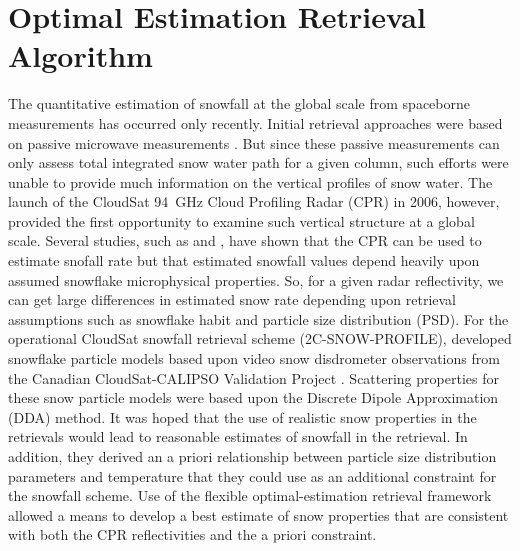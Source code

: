 \section{Optimal Estimation Retrieval Algorithm} %
\label{sec:retrieval}
The quantitative estimation of snowfall at the global scale from spaceborne measurements has occurred only recently. Initial retrieval approaches were based on passive microwave measurements \citep{skofronick-jackson_physical_2004,noh_development_2006}. But since these passive measurements can only assess total integrated snow water path for a given column, such efforts were unable to provide much information on the vertical profiles of snow water. 
The launch of the CloudSat \SI{94}{\giga\hertz} Cloud Profiling Radar (CPR) in 2006, however, provided the first opportunity to examine such vertical structure at a global scale. Several studies, such as \citet{matrosov_modeling_2007} and \citet{kulie_utilizing_2009}, have shown that the CPR can be used to estimate snofall rate but that estimated snowfall values depend heavily upon assumed snowflake microphysical properties. So, for a given radar reflectivity, we can get large differences in estimated snow rate depending upon retrieval assumptions such as snowflake habit and particle size distribution (PSD).
%
For the operational CloudSat snowfall retrieval scheme (2C-SNOW-PROFILE), \citet{wood_microphysical_2015} developed snowflake particle models based upon video snow disdrometer observations from the Canadian CloudSat-CALIPSO Validation Project \citep[C3VP,][]{hudak_canadian_2006}. Scattering properties for these snow particle models were based upon the Discrete Dipole Approximation (DDA) method. It was hoped that the use of realistic snow properties in the retrievals would lead to reasonable estimates of snowfall in the retrieval. In addition, they derived an a priori relationship between particle size distribution parameters and temperature that they could use as an additional constraint for the snowfall scheme. Use of the flexible optimal-estimation retrieval framework allowed a means to develop a best estimate of snow properties that are consistent with both the CPR reflectivities and the a priori constraint. 
